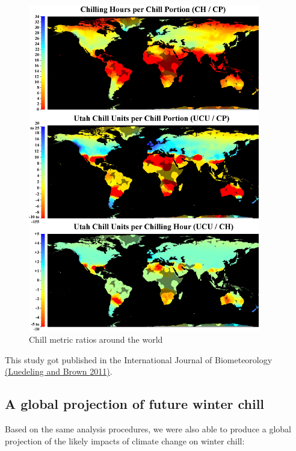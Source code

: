 \documentclass[
]{book}
\begin{document}
\begin{figure}
\centering
\includegraphics[width=0.9\textwidth,height=\textheight]{pictures/Luedeling_Fig_4_all_ratios_map.jpg}
\caption{Chill metric ratios around the world}
\end{figure}

This study got published in the International Journal of Biometeorology \href{https://link.springer.com/article/10.1007/s00484-010-0352-y}{(Luedeling and Brown \protect\hyperlink{ref-luedeling_global_2011}{2011})}.

\hypertarget{a-global-projection-of-future-winter-chill}{%
\subsection{A global projection of future winter chill}\label{a-global-projection-of-future-winter-chill}}

Based on the same analysis procedures, we were also able to produce a global projection of the likely impacts of climate change on winter chill:
\end{document}
